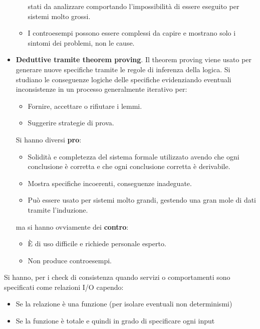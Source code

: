 \begin{itemize}
\begin{itemize}
                        stati da analizzare comportando l'impossibilità di essere
                        eseguito per sistemi molto grossi.
                  \item I controesempi possono essere complessi da capire e
                        mostrano solo i sintomi dei problemi, non le cause.
            \end{itemize}
      \item \textbf{Deduttive tramite theorem proving}. Il theorem proving viene
            usato per generare nuove specifiche tramite le regole di inferenza
            della logica. Si studiano le conseguenze logiche delle specifiche
            evidenziando eventuali inconsistenze in un processo generalmente
            iterativo per:
            \begin{itemize}
                  \item Fornire, accettare o rifiutare i lemmi.
                  \item Suggerire strategie di prova.
            \end{itemize}
            Si hanno diversi \textbf{pro}:
            \begin{itemize}
                  \item Solidità e completezza del sistema formale utilizzato
                        avendo che ogni conclusione è corretta e che ogni
                        conclusione corretta è derivabile.
                  \item Mostra specifiche incoerenti, conseguenze inadeguate.
                  \item Può essere usato per sistemi molto grandi, gestendo una
                        gran mole di dati tramite l'induzione.
            \end{itemize}
            ma si hanno ovviamente dei \textbf{contro}:
            \begin{itemize}
                  \item È di uso difficile e richiede personale esperto.
                  \item Non produce controesempi.
            \end{itemize}
\end{itemize}
Si hanno, per i check di consistenza quando servizi o comportamenti sono
specificati come relazioni I/O capendo:
\begin{itemize}
      \item Se la relazione è una funzione (per isolare eventuali non determinismi)
      \item Se la funzione è totale e quindi in grado di specificare ogni input
\end{itemize}
